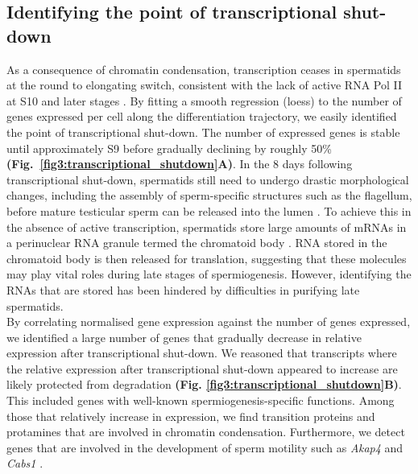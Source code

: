 \subsection{Identifying the point of transcriptional shut-down}

As a consequence of chromatin condensation, transcription ceases in spermatids at the round to elongating switch, consistent with the lack of active RNA Pol II at S10 and later stages \citep{DottermuschHeidel2014}.
By fitting a smooth regression (loess) to the number of genes expressed per cell along the differentiation trajectory, we easily identified the point of transcriptional shut-down. The number of expressed genes is stable until approximately S9 before gradually declining by roughly 50\% \textbf{(Fig.~\ref{fig3:transcriptional_shutdown}A)}. In the 8 days following transcriptional shut-down, spermatids still need to undergo drastic morphological changes, including the assembly of sperm-specific structures such as the flagellum, before mature testicular sperm can be released into the lumen \citep{ODonnell2014}. To achieve this in the absence of active transcription, spermatids store large amounts of mRNAs in a perinuclear RNA granule termed the chromatoid body \citep{Kotaja2007}. RNA stored in the chromatoid body is then released for translation, suggesting that these molecules may play vital roles during late stages of spermiogenesis. However, identifying the RNAs that are stored has been hindered by difficulties in purifying late spermatids. \\

By correlating normalised gene expression against the number of genes expressed, we identified a large number of genes that gradually decrease in relative expression after transcriptional shut-down. We reasoned that transcripts where the relative expression after transcriptional shut-down appeared to increase are likely protected from degradation \textbf{(Fig. \ref{fig3:transcriptional_shutdown}B)}. This included genes with well-known spermiogenesis-specific functions. Among those that relatively increase in expression, we find transition proteins and protamines that are involved in chromatin condensation. Furthermore, we detect genes that are involved in the development of sperm motility such as \textit{Akap4} and \textit{Cabs1} \citep{Kawashima2009, Miki2002}. 

\newpage


